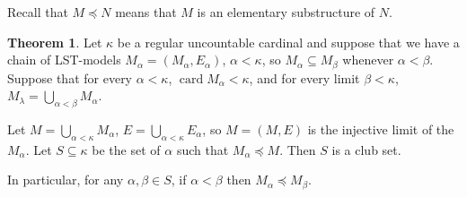 \documentclass[12pt]{report}
\newcommand{\card}{\operatorname{card}}
\theoremstyle{definition}
\newtheorem{theorem}{Theorem}[chapter]
\begin{document}
Recall that $M \preceq N$ means that $M$ is an elementary substructure of $N$.

\begin{theorem}
Let $\kappa$ be a regular uncountable cardinal and suppose that we have a chain of LST-models $M_\alpha = (M_\alpha, E_\alpha)$, $\alpha < \kappa$, so $M_\alpha \subseteq M_\beta$ whenever $\alpha < \beta$. Suppose that for every $\alpha < \kappa$, $\card M_\alpha < \kappa$, and for every limit $\beta < \kappa$, $M_\lambda = \bigcup_{\alpha < \beta} M_\alpha$.

Let $M = \bigcup_{\alpha < \kappa} M_\alpha$, $E = \bigcup_{\alpha < \kappa} E_\alpha$, so $M = (M, E)$ is the injective limit of the $M_\alpha$. Let $S \subseteq \kappa$ be the set of $\alpha$ such that $M_\alpha \preceq M$. Then $S$ is a club set.

In particular, for any $\alpha, \beta \in S$, if $\alpha < \beta$ then $M_\alpha \preceq M_\beta$.
\end{theorem}
\end{document}
